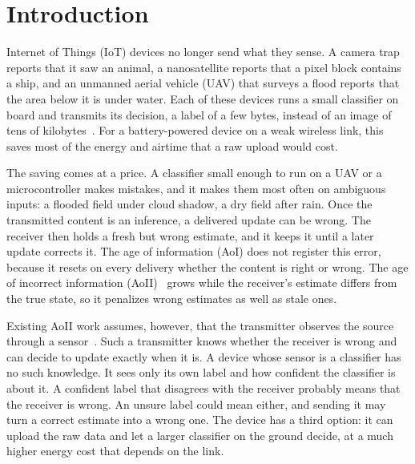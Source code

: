 \documentclass[journal]{IEEEtran}
\theoremstyle{remark}
\begin{document}
\section{Introduction}\label{sec:intro}
 Internet of Things (IoT) devices no longer send what they sense. A camera trap reports that it saw an animal, a nanosatellite reports that a pixel block contains a ship, and an unmanned aerial vehicle (UAV) that surveys a flood reports that the area below it is under water. Each of these devices runs a small classifier on board and transmits its decision, a label of a few bytes, instead of an image of tens of kilobytes~\cite{shamsoshoara2021flame,kyrkou2020aider,hosny2026tinysem}. For a battery-powered device on a weak wireless link, this saves most of the energy and airtime that a raw upload would cost.

The saving comes at a price. A classifier small enough to run on a UAV or a microcontroller makes mistakes, and it makes them most often on ambiguous inputs: a flooded field under cloud shadow, a dry field after rain. Once the transmitted content is an inference, a delivered update can be wrong. The receiver then holds a fresh but wrong estimate, and it keeps it until a later update corrects it. The age of information (AoI) does not register this error, because it resets on every delivery whether the content is right or wrong. The age of incorrect information (AoII)~\cite{maatouk2020aoii} grows while the receiver's estimate differs from the true state, so it penalizes wrong estimates as well as stale ones.

Existing AoII work assumes, however, that the transmitter observes the source through a sensor~\cite{maatouk2020aoii,zakeri2023aoiieh,ngo2025eh}. Such a transmitter knows whether the receiver is wrong and can decide to update exactly when it is. A device whose sensor is a classifier has no such knowledge. It sees only its own label and how confident the classifier is about it. A confident label that disagrees with the receiver probably means that the receiver is wrong. An unsure label could mean either, and sending it may turn a correct estimate into a wrong one. The device has a third option: it can upload the raw data and let a larger classifier on the ground decide, at a much higher energy cost that depends on the link.
\end{document}

